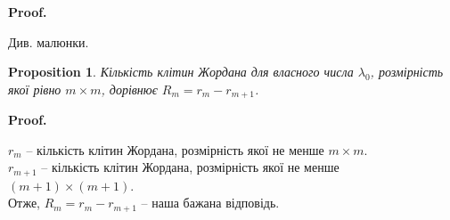 \documentclass[a4paper, 10pt]{article}
\makeatletter
\theoremstyle{theoremdd}
\newtheorem{proposition}[theorem]{Proposition}
\renewenvironment{proof}[1][Proof.\\]{\par
\pushQED{\hfill \qed}%
\normalfont \topsep6\p@\@plus6\p@\relax
\trivlist
\item\relax
{\bfseries
#1\@addpunct{.}}\hspace\labelsep\ignorespaces
}{%
\popQED\endtrivlist\@endpefalse
}
\makeatother
\begin{document}
\begin{proof}
Див. малюнки.
\iffalse
Кількість клітин Жордана розміра не менше за $m \times m$ відповідає кількості ланцюгів висоти не менше $m$.\\
$\dim (\ker B^m)$ вміщує собі кількість ланцюгів висоти $1$, кількість ланцюгів висоти $2$, $\dots$, кількість ланцюгів висоти $m$.\\
$\dim (\ker B^{m-1})$ вміщує собі кількість ланцюгів висоти $1$, кількість ланцюгів висоти $2$, $\dots$, кількість ланцюгів висоти $m-1$.
\fi
\iffalse
Кількість клітин Жордана розміра не менше $1 \times 1$ відповідала кількість л.н.з. власних векторів -> приєднаний л.н.з висоти $m$.\\
Відповідно, кількість клітин Жордана розміра не менше $m \times m$ відповідає кількість приєднаних л.н.з. висоти $m-1$.\\
$\dim (\ker (A-\lambda_0 I)^m)$ відповідає за кількість л.н.з. приєднаних висоти $0$, приєднаних висоти $1$,\dots, приєднаних висоти $m-1$. Водночас $\dim (\ker (A-\lambda_0 I)^{m-1})$ відповідає за кількість л.н.з. приєднаних висоти $0$, приєднаних висоти $1$,\dots, приєднаних висоти $m-2$.\\
Звідси $r_m = \dim(\ker(A-\lambda_0 I)^m) - \dim(\ker(A-\lambda_0 I)^{m-1})$ - наша бажана відповідь.
\fi
\end{proof}
\noindent

\begin{proposition}
Кількість клітин Жордана для власного числа $\lambda_0$, розмірність якої рівно $m \times m$, дорівнює $R_m = r_m - r_{m+1}$.
\end{proposition}

\begin{proof}
$r_m$ -- кількість клітин Жордана, розмірність якої не менше $m \times m$.\\
$r_{m+1}$ -- кількість клітин Жордана, розмірність якої не менше $(m+1) \times (m+1)$.\\
Отже, $R_m = r_m - r_{m+1}$ -- наша бажана відповідь.
\end{proof}
\end{document}
